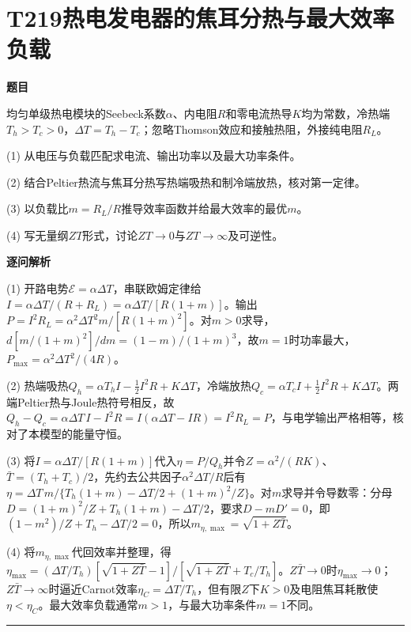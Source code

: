 \documentclass[UTF8,a4paper,11pt,oneside,openany]{ctexbook}
\begin{document}
\section*{T219\quad 热电发电器的焦耳分热与最大效率负载}
\textbf{题目}\par
均匀单级热电模块的Seebeck系数$\alpha$、内电阻$R$和零电流热导$K$均为常数，冷热端$T_h>T_c>0$，$\Delta T=T_h-T_c$；忽略Thomson效应和接触热阻，外接纯电阻$R_L$。
\par\smallskip\noindent (1) 从电压与负载匹配求电流、输出功率以及最大功率条件。
\par\smallskip\noindent (2) 结合Peltier热流与焦耳分热写热端吸热和制冷端放热，核对第一定律。
\par\smallskip\noindent (3) 以负载比$m=R_L/R$推导效率函数并给最大效率的最优$m$。
\par\smallskip\noindent (4) 写无量纲$ZT$形式，讨论$ZT\to0$与$ZT\to\infty$及可逆性。
\par\medskip\textbf{逐问解析}\par
\par\smallskip\noindent (1) 开路电势$\mathcal E=\alpha\Delta T$，串联欧姆定律给$I=\alpha\Delta T/(R+R_L)=\alpha\Delta T/[R(1+m)]$。输出$P=I^2R_L=\alpha^2\Delta T^2 m/[R(1+m)^2]$。对$m>0$求导，$d[m/(1+m)^2]/dm=(1-m)/(1+m)^3$，故$m=1$时功率最大，$P_{\max}=\alpha^2\Delta T^2/(4R)$。
\par\smallskip\noindent (2) 热端吸热$Q_h=\alpha T_h I-\tfrac12I^2R+K\Delta T$，冷端放热$Q_c=\alpha T_c I+\tfrac12I^2R+K\Delta T$。两端Peltier热与Joule热符号相反，故$Q_h-Q_c=\alpha\Delta T\,I-I^2R=I(\alpha\Delta T-IR)=I^2R_L=P$，与电学输出严格相等，核对了本模型的能量守恒。
\par\smallskip\noindent (3) 将$I=\alpha\Delta T/[R(1+m)]$代入$\eta=P/Q_h$并令$Z=\alpha^2/(RK)$、$\bar T=(T_h+T_c)/2$，先约去公共因子$\alpha^2\Delta T/R$后有$\eta=\Delta T\,m/\{T_h(1+m)-\Delta T/2+(1+m)^2/Z\}$。对$m$求导并令导数零：分母$D=(1+m)^2/Z+T_h(1+m)-\Delta T/2$，要求$D-mD'=0$，即$(1-m^2)/Z+T_h-\Delta T/2=0$，所以$m_{\eta,\max}=\sqrt{1+Z\bar T}$。
\par\smallskip\noindent (4) 将$m_{\eta,\max}$代回效率并整理，得$\eta_{\max}=(\Delta T/T_h)[\sqrt{1+Z\bar T}-1]/[\sqrt{1+Z\bar T}+T_c/T_h]$。$Z\bar T\to0$时$\eta_{\max}\to0$；$Z\bar T\to\infty$时逼近Carnot效率$\eta_C=\Delta T/T_h$，但有限$Z$下$K>0$及电阻焦耳耗散使$\eta<\eta_C$。最大效率负载通常$m>1$，与最大功率条件$m=1$不同。
\par\medskip\hrule\medskip
\end{document}
